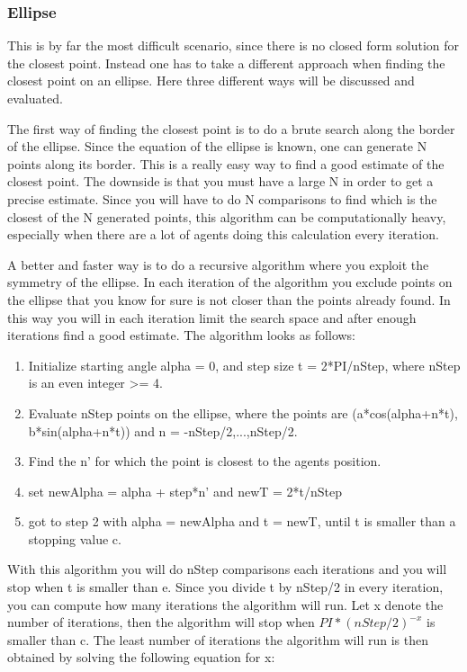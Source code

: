 \documentclass[paper=a4, fontsize=11pt,twoside]{scrartcl}		%
\begin{document}
\begin{flushleft}
\subsubsection{Ellipse}

This is by far the most difficult scenario, since there is no closed form solution for the closest point. Instead one has to take a different approach when finding the closest point on an ellipse. Here three different ways will be discussed and evaluated. \newline

The first way of finding the closest point is to do a brute search along the border of the ellipse. Since the equation of the ellipse is known, one can generate N points along its border. This is a really easy way to find a good estimate of the closest point. The downside is that you must have a large N in order to get a precise estimate. Since you will have to do N comparisons to find which is the closest of the N generated points, this algorithm can be computationally heavy, especially when there are a lot of agents doing this calculation every iteration. \newline

A better and faster way is to do a recursive algorithm where you exploit the symmetry of the ellipse. In each iteration of the algorithm you exclude points on the ellipse that you know for sure is not closer than the points already found. In this way you will in each iteration limit the search space and after enough iterations find a good estimate. The algorithm looks as follows:

\begin{enumerate}
\item Initialize starting angle alpha = 0, and step size t = 2*PI/nStep, where nStep is an even integer >= 4.
\item Evaluate nStep points on the ellipse, where the points are (a*cos(alpha+n*t), b*sin(alpha+n*t)) and n = -nStep/2,...,nStep/2.
\item Find the n’ for which the point is closest to the agents position.
\item set newAlpha = alpha + step*n’ and newT = 2*t/nStep
\item got to step 2 with alpha = newAlpha and t = newT, until t is smaller than a stopping value c.
\end{enumerate}

With this algorithm you will do nStep comparisons each iterations and you will stop when t is smaller than e. Since you divide t by nStep/2 in every iteration, you can compute how many iterations the algorithm will run. Let x denote the number of iterations, then the algorithm will stop when $PI*(nStep/2)^{-x}$ is smaller than c. The least number of iterations the algorithm will run is then obtained by solving the following equation for x:


\end{flushleft}
\end{document}
